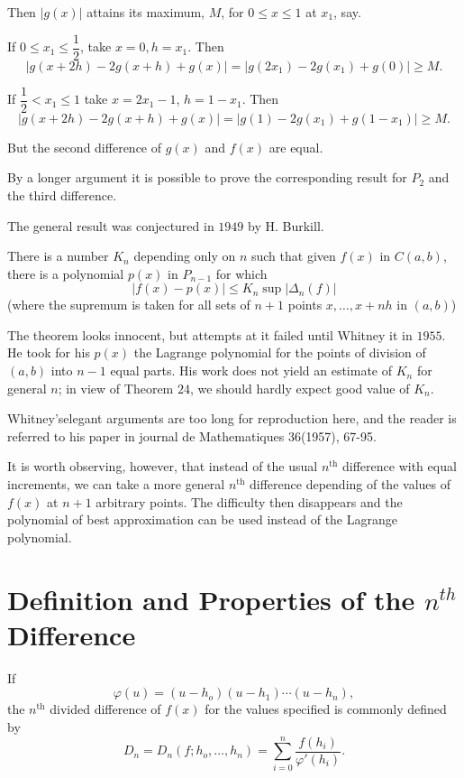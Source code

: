 Then $|g(x) | $ attains its maximum,  $M$, for $0 \le x \le 1$ at $x_1$, say. 

If $0 \le x_1 \le \dfrac{1}{2}$, take $x=0, h=x_1$. Then 
$$
|g(x+ 2h) - 2g(x+h) +g(x) | = |g(2x_1)- 2g(x_1) + g(0) | \ge M.
$$

If $\dfrac{1}{2} < x_1 \le 1$ take $x=2x_1 -1$, $h=1- x_1$. Then 
$$
|g(x+ 2h) - 2g(x+h) +g(x) | = |g(1)- 2g(x_1) + g(1-x_1) | \ge M.
$$

But the second difference of $g(x)$ and $f(x)$ are equal.


By a longer argument it is possible to prove the corresponding result
for $P_2$ and the third difference. 

The general result was conjectured in $1949$ by H. Burkill.

\begin{theorem}\label{chap6:sec15:thm25} %
  There is a number $K_n$ depending only on $n$ such that given $f(x)$
  in $C(a,b)$, there is a  polynomial $p(x)$ in $P_{n-1}$ for which  
  $$
  | f(x)  - p(x) | \le K_n \sup | \Delta_n (f) |
  $$
  (where the supremum is taken for all sets of $n+1$ points $x, \ldots
 ,  x + nh$ in $(a,b) $)  
\end{theorem}

The theorem looks innocent,  but attempts at it failed until Whitney it
in  $1955$. He took for his $p(x)$ the Lagrange polynomial for the
points of division   of $(a,b)$ into $n-1$ equal parts. His  work does
not yield an estimate of $K_n$ for general $n$; in view  of Theorem
$24$, we should hardly  expect good value of $K_n$. 

Whitney's\pageoriginale elegant arguments are too long for reproduction  here, and
the reader is referred to his paper in journal de Mathematiques
36(1957), 67-95. 

It is worth observing, however, that instead of the usual $n^{\text{th}}$
difference with equal increments, we can take a more general $n^{\text{th}}$
difference depending of the values of $f(x)$ at $n+1$ arbitrary
points. The difficulty then disappears and the polynomial of best
approximation can be used instead of the Lagrange polynomial. 

\section{Definition and Properties of the \texorpdfstring{$n^{th}$}{nth}
  Difference}\label{chap6:sec16} 

If 
$$
\varphi(u) = (u- h_o) (u-h_1) \cdots (u-h_n),
$$ 
the $n^{\text{th}}$ divided difference of $f(x)$ for the values specified is
commonly defined by  
$$
D_n = D_n (f; h_o,  \ldots,  h_n) = \sum_{i=0}^n \frac{f(h_i)}{\varphi'(h_i)}.
$$


